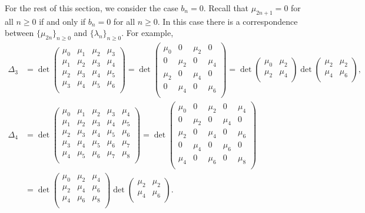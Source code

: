\documentclass[oneside]{book}
\numberwithin{equation}{section}
\theoremstyle{definition}
\begin{document}
For the rest of this section, we consider the case \( b_n=0 \). Recall
that \( \mu_{2n+1} = 0 \) for all \( n\ge0 \) if and only if
\( b_n=0 \) for all \( n\ge0 \). In this case there is a
correspondence between \( \{ \mu_{2n}\}_{n\ge 0} \) and
\( \{ \lambda_n\}_{n\ge 0} \). For example,
\begin{align*}
  \Delta_3
  & = \det 
  \begin{pmatrix}
\mu_0 & \mu_1 & \mu_2 & \mu_3 \\
\mu_1 & \mu_2 & \mu_3 & \mu_4 \\
\mu_2 & \mu_3 & \mu_4 & \mu_5 \\
\mu_3 & \mu_4 & \mu_5 & \mu_6 \\
\end{pmatrix} =\det 
  \begin{pmatrix}
\mu_0 & 0 & \mu_2 & 0 \\
0 & \mu_2 & 0 & \mu_4 \\
\mu_2 & 0 & \mu_4 & 0 \\
0 & \mu_4 & 0 & \mu_6 \\
\end{pmatrix}
= \det
\begin{pmatrix}
\mu_0 & \mu_2 \\
\mu_2 & \mu_4 \\
\end{pmatrix}
\det
\begin{pmatrix}
\mu_2 & \mu_2 \\
\mu_4 & \mu_6 \\
\end{pmatrix},\\
  \Delta_4
  &= \det 
  \begin{pmatrix}
\mu_0 & \mu_1 & \mu_2 & \mu_3 & \mu_4 \\
\mu_1 & \mu_2 & \mu_3 & \mu_4 & \mu_5 \\
\mu_2 & \mu_3 & \mu_4 & \mu_5 & \mu_6 \\
\mu_3 & \mu_4 & \mu_5 & \mu_6 & \mu_7 \\
\mu_4 & \mu_5 & \mu_6 & \mu_7 & \mu_8 \\
\end{pmatrix} =\det 
  \begin{pmatrix}
\mu_0 & 0 & \mu_2 & 0 & \mu_4 \\
0 & \mu_2 & 0 & \mu_4 & 0\\
\mu_2 & 0 & \mu_4 & 0 & \mu_6 \\
0 & \mu_4 & 0 & \mu_6 & 0 \\
\mu_4 & 0 & \mu_6 & 0 & \mu_8 \\
\end{pmatrix}\\
&= \det
\begin{pmatrix}
\mu_0 & \mu_2 & \mu_4 \\
\mu_2 & \mu_4 & \mu_6 \\
\mu_4 & \mu_6 & \mu_8 \\
\end{pmatrix}
\det
\begin{pmatrix}
\mu_2 & \mu_2 \\
\mu_4 & \mu_6 \\
\end{pmatrix}.
\end{align*}
\end{document}
